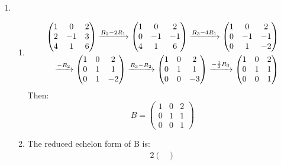 \documentclass{article}
\newcommand{\ro}[1]{%
  \xrightarrow{\mathmakebox{#1}}%
}
\begin{document}
\begin{enumerate}
\item \begin{enumerate}[label={(\roman*)}]
    \item 
      \begin{alignat*}{2}
        \begin{pmatrix}
          1 & 0 & 2 \\
          2 & - 1 & 3 \\
          4 & 1 & 6
        \end{pmatrix}
        \ro{R_2 - 2R_1}
        \begin{pmatrix}
          1 & 0 & 2 \\
          0 & -1 & -1 \\
          4 & 1 & 6
        \end{pmatrix}
        \ro{R_3 - 4R_1}
        \begin{pmatrix}
          1 & 0 & 2 \\
          0 & -1 & -1 \\
          0 & 1 & -2
        \end{pmatrix}
        \\
        \ro{-R_2}
        \begin{pmatrix}
          1 & 0 & 2 \\
          0 & 1 & 1 \\
          0 & 1 & -2
        \end{pmatrix}
        \ro{R_3 - R_2}
        \begin{pmatrix}
          1 & 0 & 2 \\
          0 & 1 & 1 \\
          0 & 0 & -3
        \end{pmatrix}
        \ro{-\frac{1}{3}R_3}
        \begin{pmatrix}
          1 & 0 & 2 \\
          0 & 1 & 1 \\
          0 & 0 & 1
        \end{pmatrix}
      \end{alignat*}
      Then:
      \[
        B = 
        \begin{pmatrix}
          1 & 0 & 2 \\
          0 & 1 & 1 \\
          0 & 0 & 1
        \end{pmatrix}
      \]
    \item The reduced echelon form of B is:
      \begin{alignat*}{2}
        \begin{pmatrix}

\end{pmatrix}
\end{alignat*}
\end{enumerate}
\end{enumerate}
\end{document}
